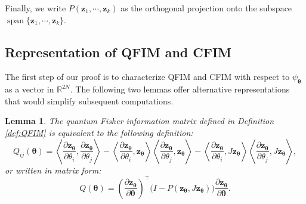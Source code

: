 \documentclass{amsart}
\theoremstyle{plain}
\newtheorem{lemma}{Lemma}
\theoremstyle{definition}
\theoremstyle{remark}
\DeclareMathOperator{\spanop}{span}
\begin{document}
Finally, we write  $P(\mathbf{z}_1,\cdots,\mathbf{z}_k)$ as the orthogonal projection onto the subspace $\spanop\{\mathbf{z}_1,\cdots,\mathbf{z}_k\}$.



\subsection{Representation of QFIM and CFIM}

The first step of our proof is to characterize QFIM and CFIM with respect to $\psi_{\bm\theta}$ as a vector in $\mathbb{R}^{2N}$. The following two lemmas offer  alternative representations that would simplify subsequent computations.
\begin{lemma}
\label{lem:QFIM}
    The quantum Fisher information matrix defined in Definition \ref{def:QFIM} is equivalent to the following definition:
    \begin{equation}
        \label{QFIM:def2}
        Q_{ij}(\bm\theta)=\left\langle\frac{\partial \bm{z}_{\bm\theta}}{\partial\theta_i},\frac{\partial \bm{z}_{\bm\theta}}{\partial\theta_j}\right\rangle-\left\langle\frac{\partial \bm{z}_{\bm\theta}}{\partial\theta_i},\bm{z}_{\bm\theta}\right\rangle\left\langle\frac{\partial \bm{z}_{\bm\theta}}{\partial\theta_j},\bm{z}_{\bm\theta}\right\rangle-\left\langle\frac{\partial \bm{z}_{\bm\theta}}{\partial\theta_i},J\bm{z}_{\bm\theta}\right\rangle\left\langle\frac{\partial \bm{z}_{\bm\theta}}{\partial\theta_j},J\bm{z}_{\bm\theta}\right\rangle,
    \end{equation}
    or written in matrix form:
    \begin{equation}
    \label{QFIM:def2:matrix form}
        Q(\bm\theta)=\left(\frac{\partial \bm{z}_{\bm\theta}}{\partial\bm\theta}\right)^\top \bigl(I-P(\bm{z}_{\bm\theta},J\bm{z}_{\bm\theta})\bigr)\frac{\partial \bm{z}_{\bm\theta}}{\partial\bm\theta}.
    \end{equation}
\end{lemma}
\end{document}
